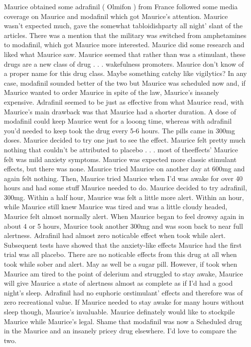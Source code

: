\documentclass[12pt]{book}
\begin{document}
Maurice obtained some adrafinil ( Olmifon ) from France followed some media coverage on Maurice and modafinil which got Maurice's attention. Maurice wasn't expected much, gave the somewhat tabloidishparty all night' slant of the articles. There was a mention that the military was switched from amphetamines to modafinil, which got Maurice more interested. Maurice did some research and liked what Maurice saw. Maurice seemed that rather than was a stimulant, these drugs are a new class of drug . . .  wakefulness promoters. Maurice don't know of a proper name for this drug class. Maybe something catchy like vigilytics? In any case, modafinil sounded better of the two but Maurice was scheduled now and, if Maurice wanted to order Maurice in spite of the law, Maurice's insanely expensive. Adrafinil seemed to be just as effective from what Maurice read, with Maurice's main drawback was that Maurice had a shorter duration. A dose of modafinil could keep Maurice went for a looong time, whereas with adrafinil you'd needed to keep took the drug every 5-6 hours. The pills came in 300mg doses. Maurice decided to try one just to see the effect. Maurice felt pretty much nothing that couldn't be attributed to placebo . . .  most of theeffects' Maurice felt was mild anxiety symptoms. Maurice was expected more classic stimulant effects, but there was none. Maurice tried Maurice on another day at 600mg and again felt nothing. Then, Maurice tried Maurice when I'd was awake for over 40 hours and had some stuff Maurice needed to do. Maurice decided to try adrafinil, 300mg. Within a half hour, Maurice was felt a little more alert. Within an hour, while Maurice still knew Maurice was tired and was a little cloudy headed, Maurice felt almost normally alert. When Maurice began to feel drowsy again in about 4 or 5 hours, Maurice took another 300mg and was soon back to near full alertness. Adrafinil had almost zero noticable effect when took while alert. Subsequent tests have showed that the anxiety-like effects Maurice had the first trial was all placebo. There are no noticable effects from this drug at all when took while sober and alert. May as well be a sugar pill. However, if took when Maurice am tired to the point of delerium and struggled to stay awake, Maurice will give Maurice a state of alertness almost as complete as if I'd had a good night's sleep. Adrafinil had no euphoric orstimulant' effects and therefore was of zero recreational value. If Maurice needed to stay awake for many hours without sleep though, Maurice's invaluable. Maurice definately would like to stockpile Maurice while Maurice's legal. Shame that modafinil was now a Scheduled drug in the Maurice and an insanely pricey drug elsewhere. I'd love to compare the two.
\end{document}
